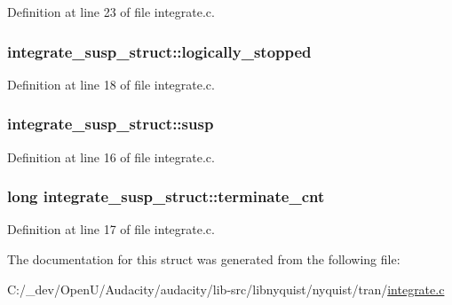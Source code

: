 Definition at line 23 of file integrate.\+c.

\subsubsection[{\texorpdfstring{logically\+\_\+stopped}{logically_stopped}}]{ integrate\+\_\+susp\+\_\+struct\+::logically\+\_\+stopped}\hypertarget{structintegrate__susp__struct_a628ce2b054e50eb5667a46c698b9f9de}{}\label{structintegrate__susp__struct_a628ce2b054e50eb5667a46c698b9f9de}


Definition at line 18 of file integrate.\+c.

\subsubsection[{\texorpdfstring{susp}{susp}}]{ integrate\+\_\+susp\+\_\+struct\+::susp}\hypertarget{structintegrate__susp__struct_ad92bbc2f599987fac17bd9f9132d26d3}{}\label{structintegrate__susp__struct_ad92bbc2f599987fac17bd9f9132d26d3}


Definition at line 16 of file integrate.\+c.

\subsubsection[{\texorpdfstring{terminate\+\_\+cnt}{terminate_cnt}}]{\setlength{\rightskip}{0pt plus 5cm}long integrate\+\_\+susp\+\_\+struct\+::terminate\+\_\+cnt}\hypertarget{structintegrate__susp__struct_ab6d28d7c6107a765aa00e6eac8ee7f32}{}\label{structintegrate__susp__struct_ab6d28d7c6107a765aa00e6eac8ee7f32}


Definition at line 17 of file integrate.\+c.



The documentation for this struct was generated from the following file\+:\begin{DoxyCompactItemize}
\item 
C\+:/\+\_\+dev/\+Open\+U/\+Audacity/audacity/lib-\/src/libnyquist/nyquist/tran/\hyperlink{integrate_8c}{integrate.\+c}\end{DoxyCompactItemize}
